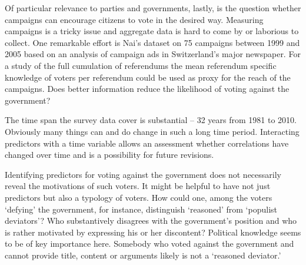 \documentclass[11pt,a4paper]{article}\usepackage[]{graphicx}\usepackage[]{color}
\begin{document}
    
    Of particular relevance to parties and governments, lastly, is the question whether campaigns can encourage citizens to vote in the desired way. Measuring campaigns is a tricky issue and aggregate data is hard to come by or laborious to collect. One remarkable effort is Nai's \citeyear{nai_choisir_2013} dataset on 75 campaigns between 1999 and 2005 based on an analysis of campaign ads in Switzerland's major newspaper. For a study of the full cumulation of referendums the mean referendum specific knowledge of voters per referendum could be used as proxy for the reach of the campaigns. Does better information reduce the likelihood of voting against the government?
    
    The time span the survey data cover is substantial -- 32 years from 1981 to 2010. Obviously many things can and do change in such a long time period. Interacting predictors with a time variable allows an assessment whether correlations have changed over time and is a possibility for future revisions.
    
    Identifying predictors for voting against the government does not necessarily reveal the motivations of such voters. It might be helpful to have not just predictors but also a typology of voters. How could one, among the voters `defying' the government, for instance, distinguish `reasoned' from `populist deviators'?  Who substantively disagrees with the government's position and who is rather motivated by expressing his or her discontent? Political knowledge seems to be of key importance here. Somebody who voted against the government and cannot provide title, content or arguments likely is not a `reasoned deviator.' %
    
    
\end{document}
